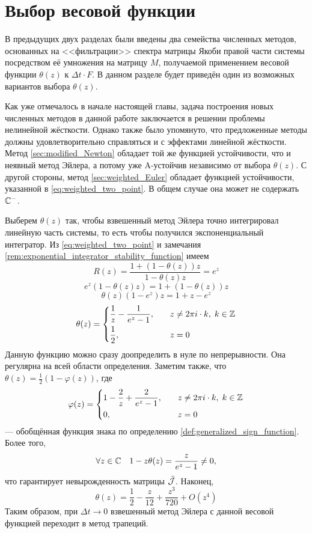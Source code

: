 \section{Выбор весовой функции}
\label{sec:choosing_weight}

В предыдущих двух разделах были введены два семейства численных методов,
основанных на <<фильтрации>> спектра матрицы Якоби правой части системы
посредством её умножения на матрицу $ M $,
получаемой применением весовой функции $ \theta(z) $ к $ \Delta t \cdot F $.
В данном разделе будет приведён один из возможных вариантов выбора $ \theta(z) $.

Как уже отмечалось в начале настоящей главы,
задача построения новых численных методов в данной работе заключается в решении проблемы нелинейной жёсткости.
Однако также было упомянуто, что предложенные методы должны удовлетворительно справляться и с эффектами линейной жёсткости.
Метод \ref{sec:modified_Newton} обладает той же функцией устойчивости, что и неявный метод Эйлера,
а потому уже A-устойчив независимо от выбора $ \theta(z) $.
С другой стороны, метод \ref{sec:weighted_Euler} обладает функцией устойчивости,
указанной в \eqref{eq:weighted_two_point}.
В общем случае она может не содержать $ \mathbb{C}^- $.

Выберем $ \theta(z) $ так, чтобы взвешенный метод Эйлера точно интегрировал линейную часть системы,
то есть чтобы получился экспоненциальный интегратор.
Из \eqref{eq:weighted_two_point} и замечания \ref{rem:exponential_integrator_stability_function} имеем
\[
    R(z) = \frac{1 + (1 - \theta(z)) z}{1 - \theta(z) z} = e^z
\]
\[
    e^z (1 - \theta(z) z) = 1 + (1 - \theta(z)) z
\]
\[
    \theta(z) \left( 1 - e^z \right) z = 1 + z - e^z
\]
\begin{equation}
    \label{eq:exponential_integrator_weight}
    \theta(z) =
    \begin{dcases}
        \frac{1}{z} - \frac{1}{e^z - 1}, &\quad z \neq 2 \pi i \cdot k, \; k \in \mathbb{Z} \\
        \frac{1}{2}, &\quad z = 0
    \end{dcases}
\end{equation}
Данную функцию можно сразу доопределить в нуле по непрерывности.
Она регулярна на всей области определения.
Заметим также, что $ \theta(z) = \frac{1}{2} (1 - \varphi(z)) $, где
\begin{equation}
    \label{eq:exponential_integrator_sign}
    \varphi(z) =
    \begin{dcases}
        1 - \frac{2}{z} + \frac{2}{e^z - 1}, &\quad z \neq 2 \pi i \cdot k, \; k \in \mathbb{Z} \\
        0, &\quad z = 0
    \end{dcases}
\end{equation}
--- обобщённая функция знака по определению \ref{def:generalized_sign_function}.
Более того,
\[
    \forall z \in \mathbb{C} \quad 1 - z \theta(z) = \frac{z}{e^z - 1} \neq 0,
\]
что гарантирует невырожденность матрицы $ \bar{\mathcal{J}} $.
Наконец,
\begin{equation}
    \label{eq:exponential_integrator_weight_series}
    \theta(z) = \frac{1}{2} - \frac{z}{12} + \frac{z^3}{720} + O(z^4)
\end{equation}
Таким образом, при $ \Delta t \to 0 $ взвешенный метод Эйлера с данной весовой функцией переходит в метод трапеций.
